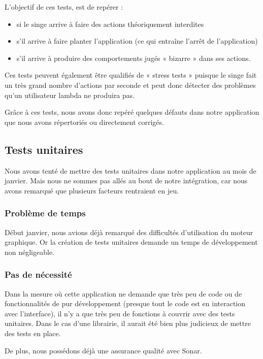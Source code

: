 \documentclass{report}
\begin{document}
L’objectif de ces tests, est de repérer :
\begin{itemize}
\item si le singe arrive à faire des actions théoriquement interdites
\item s’il arrive à faire planter l’application (ce qui entraîne l’arrêt
de l’application)
\item s’il arrive à produire des comportements jugés « bizarre » dans
ses actions.
\end{itemize}
Ces tests peuvent également être qualifiés de « stress tests » puisque
le singe fait un très grand nombre d’actions par seconde et peut donc
détecter des problèmes qu’un utilisateur lambda ne produira pas.

Grâce à ces tests, nous avons donc repéré quelques défauts dans notre
application que nous avons répertoriés ou directement corrigés.

\subsection{Tests unitaires}
\bigskip


Nous avons tenté de mettre des tests unitaires dans notre application
au mois de janvier. Mais nous ne sommes pas allés au bout de notre
intégration, car nous avons remarqué que plusieurs facteurs rentraient
en jeu.

\subsubsection{Problème de temps}

Début janvier, nous avions déjà remarqué des difficultés d’utilisation
du moteur graphique. Or la création de tests unitaires demande un temps
de développement non négligeable.

\subsubsection{Pas de nécessité}

Dans la mesure où cette application ne demande que très peu de code ou
de fonctionnalités de pur développement (presque tout le code est en
interaction avec l’interface), il n’y a que très peu de fonctions à
couvrir avec des tests unitaires. Dans le cas d’une librairie, il aurait
été bien plus judicieux de mettre des tests en place.

De plus, nous possédons déjà une assurance qualité avec Sonar.
\end{document}
